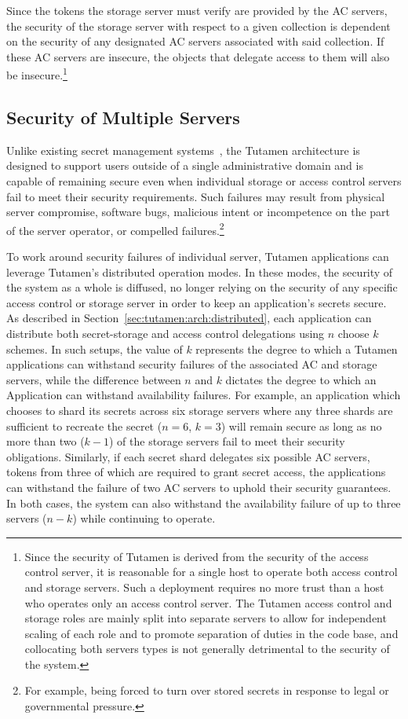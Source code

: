 Since the tokens the storage server must verify are provided by the AC
servers, the security of the storage server with respect to a given
collection is dependent on the security of any designated AC servers
associated with said collection. If these AC servers are insecure, the
objects that delegate access to them will also be
insecure.\footnote{Since the security of Tutamen is derived from the
  security of the access control server, it is reasonable for a single
  host to operate both access control and storage servers. Such a
  deployment requires no more trust than a host who operates only an
  access control server. The Tutamen access control and storage roles
  are mainly split into separate servers to allow for independent
  scaling of each role and to promote separation of duties in the code
  base, and collocating both servers types is not generally
  detrimental to the security of the system.}

\subsection{Security of Multiple Servers}

Unlike existing secret management systems~\cite{vault, confidant,
  keywhiz}, the Tutamen architecture is designed to support users
outside of a single administrative domain and is capable of remaining
secure even when individual storage or access control servers fail to
meet their security requirements. Such failures may result from
physical server compromise, software bugs, malicious intent or
incompetence on the part of the server operator, or compelled
failures.\footnote{For example, being forced to turn over stored
  secrets in response to legal or governmental pressure.}

To work around security failures of individual server, Tutamen
applications can leverage Tutamen's distributed operation modes. In
these modes, the security of the system as a whole is diffused, no
longer relying on the security of any specific access control or
storage server in order to keep an application's secrets secure. As
described in Section~\ref{sec:tutamen:arch:distributed}, each
application can distribute both secret-storage and access control
delegations using $n$ choose $k$ schemes. In such setups, the value of
$k$ represents the degree to which a Tutamen applications can
withstand security failures of the associated AC and storage servers,
while the difference between $n$ and $k$ dictates the degree to which
an Application can withstand availability failures. For example, an
application which chooses to shard its secrets across six storage
servers where any three shards are sufficient to recreate the secret
($n=6$, $k=3$) will remain secure as long as no more than two ($k-1$)
of the storage servers fail to meet their security
obligations. Similarly, if each secret shard delegates six possible AC
servers, tokens from three of which are required to grant secret
access, the applications can withstand the failure of two AC servers
to uphold their security guarantees. In both cases, the system can
also withstand the availability failure of up to three servers ($n-k$)
while continuing to operate.

